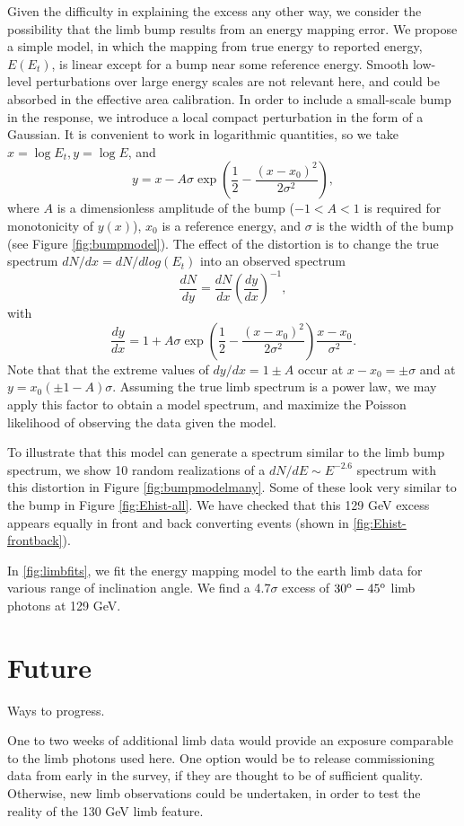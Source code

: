 \documentclass[aps,twocolumn,prd,superscriptaddress,showpacs,nofootinbib,fixfloat]{revtex4}
\newcommand{\be}{\begin{equation}}
\newcommand{\ee}{\end{equation}}
\newcommand{\degree}{^{\rm o}}
\begin{document}
Given the difficulty in explaining the excess any other way, we consider the
possibility that the limb bump results from an energy mapping error.  We
propose a simple model, in which the mapping from true energy to reported
energy, $E(E_t)$, is linear except for a bump near some reference energy.
Smooth low-level perturbations over large energy scales are not relevant here,
and could be absorbed in the effective area calibration.  In order to include
a small-scale bump in the response, we introduce a local compact perturbation
in the form of a Gaussian.  It is convenient to work in logarithmic
quantities, so we take $x=\log E_t, y=\log E$, and
\be
\label{eq:yofx}
y=x - A\sigma \exp\left(\frac{1}{2}-\frac{(x-x_0)^2}{2\sigma^2}\right),
\ee
where $A$ is a dimensionless amplitude of the bump ($-1<A<1$ is required
for monotonicity of $y(x)$), $x_0$ is a reference energy, and $\sigma$ is the
width of the bump (see Figure \ref{fig:bumpmodel}).
The effect of the distortion is to change the true spectrum $dN/dx =
dN/dlog(E_t)$ into an observed spectrum
\be
\label{eq:dndy}
\frac{dN}{dy} = \frac{dN}{dx} \left(\frac{dy}{dx}\right)^{-1} ,
\ee
with
\be
\label{eq:dydx}
\frac{dy}{dx} = 1 + A\sigma \exp\left(\frac{1}{2}-\frac{(x-x_0)^2}{2\sigma^2}\right)
\frac{x-x_0}{\sigma^2}.
\ee
Note that that the extreme values of $dy/dx = 1 \pm A$ occur at $x-x_0 = \pm
\sigma$ and at $y=x_0(\pm1-A)\sigma$.  Assuming the true limb spectrum is a
power law, we may apply this factor to obtain a model spectrum, and maximize
the Poisson likelihood of observing the data given the model.

To illustrate that this model can generate a spectrum
similar to the limb bump spectrum, we show 10 random
realizations of a $dN/dE \sim E^{-2.6}$ spectrum with this
distortion in Figure \ref{fig:bumpmodelmany}.  Some of these
look very similar to the bump in Figure
\ref{fig:Ehist-all}. We have checked that this 129 GeV
excess appears equally in front and back converting events
(shown in \ref{fig:Ehist-frontback}).

In \ref{fig:limbfits}, we fit the energy mapping model to
the earth limb data for various range of inclination
angle. We find a 4.7$\sigma$ excess of $30\degree-45\degree$
limb photons at 129 GeV.

\clearpage
\section{Future}
Ways to progress.

One to two weeks of additional limb data would provide an exposure comparable
to the limb photons used here.  One option would be to release commissioning
data from early in the survey, if they are thought to be of sufficient
quality.  Otherwise, new limb observations could be undertaken, in order to
test the reality of the 130 GeV limb feature.  
\end{document}
